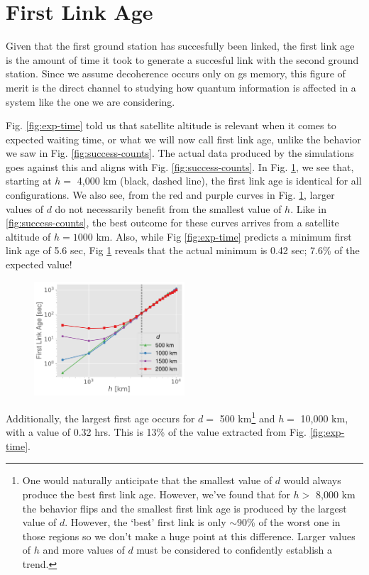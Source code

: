 \section{First Link Age}

Given that the first ground station has succesfully been linked, the first link age is the amount of time it took to generate a succesful link with the second ground station. Since we assume decoherence occurs only on gs memory, this figure of merit is the direct channel to studying how quantum information is affected in a system like the one we are considering.

Fig. \ref{fig:exp-time} told us that satellite altitude is relevant when it comes to expected waiting time, or what we will now call first link age, unlike the behavior we saw in Fig. \ref{fig:success-counts}. The actual data produced by the simulations goes against this and aligns with Fig. \ref{fig:success-counts}. In Fig. \ref{fig:fla}, we see that, starting at \(h =\) 4,000 km (black, dashed line), the first link age is identical for all configurations. We also see, from the \textcolor{myred}{red} and \textcolor{mypurple}{purple} curves in Fig. \ref{fig:fla}, larger values of \(d\) do not necessarily benefit from the smallest value of \(h\). Like in \ref{fig:success-counts}, the best outcome for these curves arrives from a satellite altitude of \(h = 1000\) km. Also, while Fig \ref{fig:exp-time} predicts a minimum first link age of 5.6 sec, Fig \ref{fig:fla} reveals that the actual minimum is 0.42 sec; 7.6\% of the expected value!

\begin{figure}
    \centering
    \vspace{-.1\baselineskip}
    \includegraphics[width=0.5\textwidth]{figures/fla.pdf}
    \caption{}
    \label{fig:fla}
\end{figure}

Additionally, the largest first age occurs for \(d =\) 500 km\footnote{One would naturally anticipate that the smallest value of \(d\) would always produce the best first link age. However, we've found that for \(h >\) 8,000 km the behavior flips and the smallest first link age is produced by the largest value of \(d\). However, the `best' first link is only \(\sim\)90\% of the worst one in those regions so we don't make a huge point at this difference. Larger values of \(h\) and more values of \(d\) must be considered to confidently establish a trend.} and \(h =\) 10,000 km, with a value of 0.32 hrs. This is 13\% of the value extracted from Fig. \ref{fig:exp-time}.

